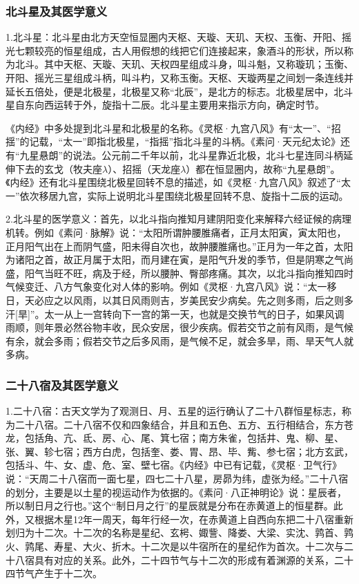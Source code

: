 \documentclass[draft,12pt]{ctexbook}
\begin{document}
\subsubsection{北斗星及其医学意义}%

1.北斗星：北斗星由北方天空恒显圈内天枢、天璇、天玑、天权、玉衡、开阳、摇光七颗较亮的恒星组成，古人用假想的线把它们连接起来，象酒斗的形状，所以称为北斗。其中天枢、天璇、天玑、天权四星组成斗身，叫斗魁，又称璇玑；玉衡、开阳、摇光三星组成斗柄，叫斗杓，又称玉衡。天枢、天璇两星之间划一条连线并延长五倍处，便是北极星，北极星又称“北辰”，是北方的标志。北极星居中，北斗星自东向西运转于外，旋指十二辰。北斗星主要用来指示方向，确定时节。

《内经》中多处提到北斗星和北极星的名称。《灵枢·九宫八风》有“太一”、“招揺”的记载，“太一”即指北极星，“指摇”指北斗星的斗柄。《素问·天元纪太论》还有“九星悬朗”的说法。公元前二千年以前，北斗星靠近北极，北斗七星连同斗柄延伸下去的玄戈（牧夫座$\lambda$）、招摇（天龙座$\lambda$）都在恒显圈内，故称“九星悬朗”。《内经》还有北斗星围绕北极星回转不息的描述，如《灵枢·九宫八风》叙述了“太一”依次移居九宫，实际上说明北斗星围绕北极星回转不息、旋指十二辰的运动。

2.北斗星的医学意义：首先，以北斗指向推知月建阴阳变化来解释六经证候的病理机转。例如《素问·脉解》说：“太阳所谓肿腰脽痛者，正月太阳寅，寅太阳也，正月阳气出在上而阴气盛，阳未得自次也，故肿腰脽痛也。”正月为一年之首，太阳为诸阳之首，故正月属于太阳，而月建在寅，是阳气升发的季节，但是阴寒之气尚盛，阳气当旺不旺，病及于经，所以腰肿、臀部疼痛。其次，以北斗指向推知四时气候变迁、八方气象变化对人体的影响。例如《灵枢·九宫八风》说：“太一移日，天必应之以风雨，以其日风雨则吉，岁美民安少病矣。先之则多雨，后之则多汗[旱]”。太一从上一宫转向下一宫的第一天，也就是交换节气的日子，如果风调雨顺，则年景必然谷物丰收，民众安居，很少疾病。假若交节之前有风雨，是气候有余，就会多雨；假若交节之后多风雨，是气候不足，就会多旱，雨、旱天气人就多病。

\subsubsection{二十八宿及其医学意义}%

1.二十八宿：古天文学为了观测日、月、五星的运行确认了二十八群恒星标志，称为二十八宿。二十八宿不仅和四象结合，并且和五色、五方、五行相结合，东方苍龙，包括角、亢、氐、房、心、尾、箕七宿；南方朱雀，包括井、鬼、柳、星、张、翼、轸七宿；西方白虎，包括奎、娄、胃、昂、毕、觜、参七宿；北方玄武，包括斗、牛、女、虚、危、室、壁七宿。《内经》中已有记载，《灵枢·卫气行》说：“天周二十八宿而一面七星，四七二十八星，房昴为纬，虚张为经。”二十八宿的划分，主要是以土星的视运动作为依据的。《素问·八正神明论》说：星辰者，所以制日月之行也。”这个“制日月之行”的星辰就是分布在赤黄道上的恒星群。此外，又根据木星12年一周天，每年行经一次，在赤黄道上自西向东把二十八宿重新划归为十二次。十二次的名称是星纪、玄枵、娵訾、降娄、大梁、实沈、鹑首、鹑火、鹑尾、寿星、大火、折木。十二次是以牛宿所在的星纪作为首次。十二次与二十八宿具有对应的关系。此外，二十四节气与十二次的形成有着渊源的关系，二十四节气产生于十二次。
\end{document}
